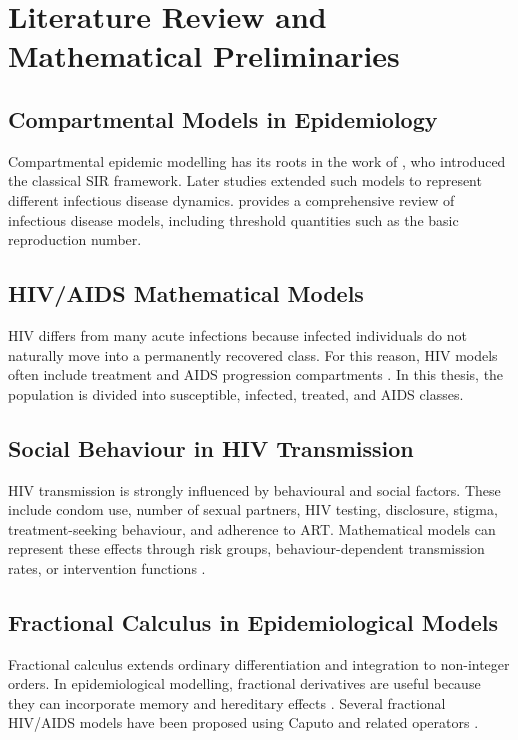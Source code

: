 \documentclass[12pt,a4paper,oneside]{report}
\begin{document}
\chapter{Literature Review and Mathematical Preliminaries}

\section{Compartmental Models in Epidemiology}
Compartmental epidemic modelling has its roots in the work of \citet{Kermack1927}, who introduced the classical SIR framework. Later studies extended such models to represent different infectious disease dynamics. \citet{Hethcote2000} provides a comprehensive review of infectious disease models, including threshold quantities such as the basic reproduction number.

\section{HIV/AIDS Mathematical Models}
HIV differs from many acute infections because infected individuals do not naturally move into a permanently recovered class. For this reason, HIV models often include treatment and AIDS progression compartments \citep{AndersonMay1991,SilvaTorres2017}. In this thesis, the population is divided into susceptible, infected, treated, and AIDS classes.

\section{Social Behaviour in HIV Transmission}
HIV transmission is strongly influenced by behavioural and social factors. These include condom use, number of sexual partners, HIV testing, disclosure, stigma, treatment-seeking behaviour, and adherence to ART. Mathematical models can represent these effects through risk groups, behaviour-dependent transmission rates, or intervention functions \citep{Massad2022,Supervie2013}.

\section{Fractional Calculus in Epidemiological Models}
Fractional calculus extends ordinary differentiation and integration to non-integer orders. In epidemiological modelling, fractional derivatives are useful because they can incorporate memory and hereditary effects \citep{Podlubny1999,Kilbas2006,Diethelm2010}. Several fractional HIV/AIDS models have been proposed using Caputo and related operators \citep{Gunerhan2020,Unaegbu2021}.
\end{document}
